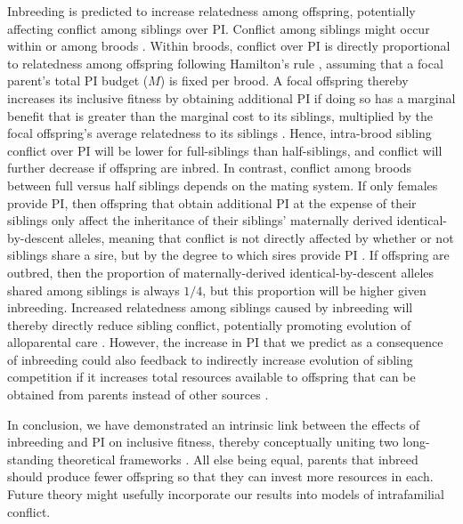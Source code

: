 \documentclass[12pt]{article}
\begin{document}
{\color{blue}Inbreeding is predicted to increase relatedness among offspring, potentially affecting conflict among siblings over PI. Conflict among siblings might occur within or among broods \cite{Parker2002, Bonisoli-Alquati2011, Ruch2014}. Within broods, conflict over PI is directly proportional to relatedness among offspring following Hamilton's rule \cite{Hamilton1964, Hamilton1964a}, assuming that a focal parent's total PI budget ($M$) is fixed per brood. A focal offspring thereby increases its inclusive fitness by obtaining additional PI if doing so has a marginal benefit that is greater than the marginal cost to its siblings, multiplied by the focal offspring's average relatedness to its siblings \cite{Parker2002}. Hence, intra-brood sibling conflict over PI will be lower for full-siblings than half-siblings, and conflict will further decrease if offspring are inbred. In contrast, conflict among broods between full versus half siblings depends on the mating system. If only females provide PI, then offspring that obtain additional PI at the expense of their siblings only affect the inheritance of their siblings' maternally derived identical-by-descent alleles, meaning that conflict is not directly affected by whether or not siblings share a sire, but by the degree to which sires provide PI \cite{Lessells1999, Parker2002}. If offspring are outbred, then the proportion of maternally-derived identical-by-descent alleles shared among siblings is always $1/4$, but this proportion will be higher given inbreeding. Increased relatedness among siblings caused by inbreeding will thereby directly reduce sibling conflict, potentially promoting evolution of alloparental care \cite{Gardner2014c, Davies2016}. However, the increase in PI that we predict as a consequence of inbreeding could also feedback to indirectly increase evolution of sibling competition if it increases total resources available to offspring that can be obtained from parents instead of other sources \cite{Gardner2011a}.}

{\color{blue}In conclusion, we have demonstrated an intrinsic link between the effects of inbreeding and PI on inclusive fitness, thereby conceptually uniting two long-standing theoretical frameworks \cite[][]{Parker1979, Parker2006, Macnair1978, Parker1978}. All else being equal, parents that inbreed should produce fewer offspring so that they can invest more resources in each. Future theory might usefully incorporate our results into models of intrafamilial conflict.}
\end{document}
